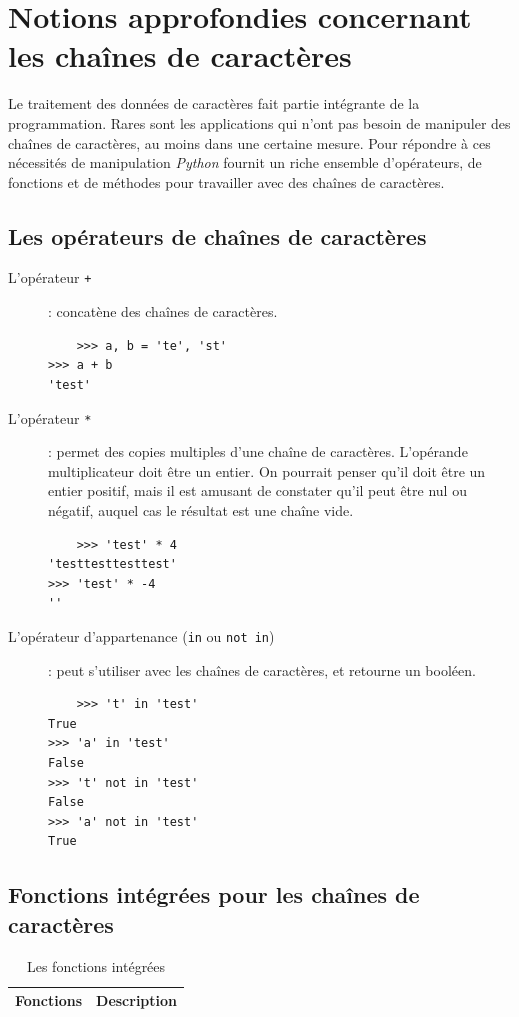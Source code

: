 \documentclass[a4paper,12pt]{book}
\begin{document}
\chapter{Notions approfondies concernant les chaînes de caractères}
Le traitement des données de caractères fait partie intégrante de la programmation. Rares sont les applications qui n'ont pas besoin de manipuler des chaînes de caractères, au moins dans une certaine mesure. Pour répondre à ces nécessités de manipulation \textit{Python} fournit un riche ensemble d'opérateurs, de fonctions et de méthodes pour travailler avec des chaînes de caractères. 

\section{Les opérateurs de chaînes de caractères}
\begin{description}
	\item[L'opérateur \texttt{+}]: concatène des chaînes de caractères.
	\begin{verbatim}
	>>> a, b = 'te', 'st'
>>> a + b
'test'
	\end{verbatim}
	\item[L'opérateur \texttt{*}]: permet des copies multiples d'une chaîne de caractères. L'opérande multiplicateur doit être un entier. On pourrait penser qu'il doit être un entier positif, mais il est amusant de constater qu'il peut être nul ou négatif, auquel cas le résultat est une chaîne vide.
	\begin{verbatim}
	>>> 'test' * 4
'testtesttesttest'
>>> 'test' * -4
''
	\end{verbatim}
	\item[L'opérateur d'appartenance (\texttt{in} ou \texttt{not in})]: peut s'utiliser avec les chaînes de caractères, et retourne un booléen.
	\begin{verbatim}
	>>> 't' in 'test'
True
>>> 'a' in 'test'
False
>>> 't' not in 'test'
False
>>> 'a' not in 'test'
True
	\end{verbatim}
\end{description}
\medskip

\section{Fonctions intégrées pour les chaînes de caractères}
\begin{table}[h]
\begin{center}
\begin{tabular}{|p{3cm}|p{11cm}|}
\hline
\textbf{Fonctions} & \textbf{Description} \\
\hline
\end{tabular}
\caption{Les fonctions intégrées}\label{function_str}
\end{center}
\end{table}
\end{document}
